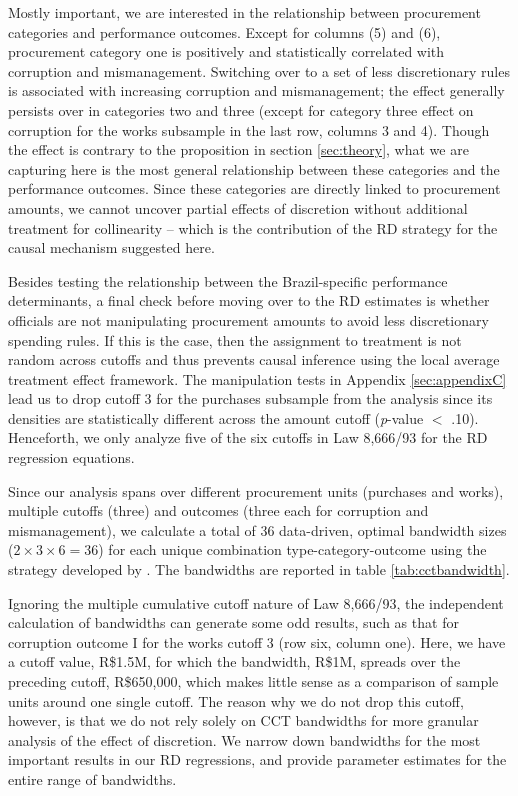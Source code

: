 \documentclass[11pt]{article}
\begin{document}
Mostly important, we are interested in the relationship between procurement categories and performance outcomes. Except for columns (5) and (6), procurement category one is positively and statistically correlated with corruption and mismanagement. Switching over to a set of less discretionary rules is associated with increasing corruption and mismanagement; the effect generally persists over in categories two and three (except for category three effect on corruption for the works subsample in the last row, columns 3 and 4). Though the effect is contrary to the proposition in section \ref{sec:theory}, what we are capturing here is the most general relationship between these categories and the performance outcomes. Since these categories are directly linked to procurement amounts, we cannot uncover partial effects of discretion without additional treatment for collinearity -- which is the contribution of the RD strategy for the causal mechanism suggested here.

Besides testing the relationship between the Brazil-specific performance determinants, a final check before moving over to the RD estimates is whether officials are not manipulating procurement amounts to avoid less discretionary spending rules. If this is the case, then the assignment to treatment is not random across cutoffs and thus prevents causal inference using the local average treatment effect framework. The manipulation tests in Appendix \ref{sec:appendixC} lead us to drop cutoff 3 for the purchases subsample from the analysis since its densities are statistically different across the amount cutoff (\emph{p}-value $<$ .10). Henceforth, we only analyze five of the six cutoffs in Law 8,666/93 for the RD regression equations.

Since our analysis spans over different procurement units (purchases and works), multiple cutoffs (three) and outcomes (three each for corruption and mismanagement), we calculate a total of 36 data-driven, optimal bandwidth sizes ($2 \times 3 \times 6 = 36$) for each unique combination type-category-outcome using the strategy developed by \citet{CalonicoOptimalDataDrivenRegression2015}. The bandwidths are reported in table \ref{tab:cctbandwidth}.



Ignoring the multiple cumulative cutoff nature of Law 8,666/93, the independent calculation of bandwidths can generate some odd results, such as that for corruption outcome I for the works cutoff 3 (row six, column one). Here, we have a cutoff value, R\$1.5M, for which the bandwidth, R\$1M, spreads over the preceding cutoff, R\$650,000, which makes little sense as a comparison of sample units around one single cutoff. The reason why we do not drop this cutoff, however, is that we do not rely solely on CCT bandwidths for more granular analysis of the effect of discretion. We narrow down bandwidths for the most important results in our RD regressions, and provide parameter estimates for the entire range of bandwidths.
\end{document}
